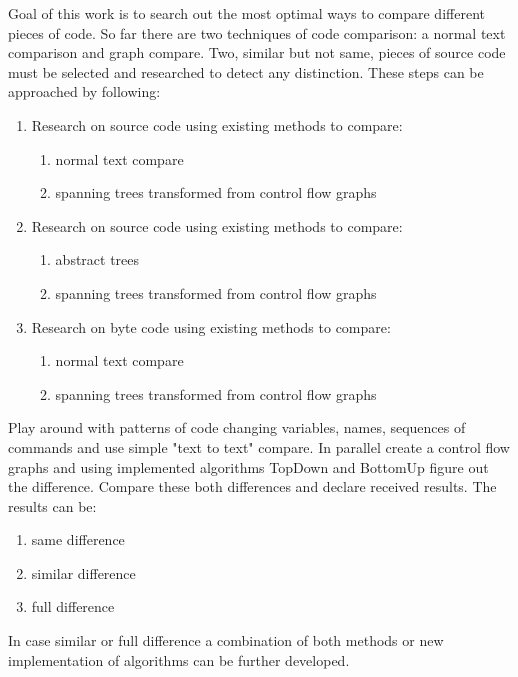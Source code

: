 Goal of this work is to search out the most optimal ways to compare different pieces of code. So far there are two techniques of code comparison: a normal text comparison and graph compare. 
Two, similar but not same, pieces of source code must be selected and researched to detect any distinction. These steps can be approached by following:

\begin{enumerate}
  \item Research on source code using existing methods to compare:
  	\begin{enumerate}
   	 	\item normal text compare
   		 \item spanning trees transformed from control flow graphs
	 \end{enumerate}	
  \item Research on source code using existing methods to compare:
  \begin{enumerate}
    \item abstract trees
    \item spanning trees transformed from control flow graphs
  \end{enumerate}
  \item Research on byte code using existing methods to compare:
  \begin{enumerate}
    \item normal text compare
    \item spanning trees transformed from control flow graphs
  \end{enumerate}
\end{enumerate}

	
Play around with patterns of code changing variables, names, sequences of commands and use simple "text to text" compare. In parallel create a control flow graphs and using implemented algorithms TopDown and BottomUp figure out the difference. Compare these both differences and declare received results.
The results can be: 
\begin{enumerate}
  \item same difference
  \item similar difference
  \item full difference
\end{enumerate}
In case similar or full difference a combination of both methods or new implementation of algorithms can be further developed. 

